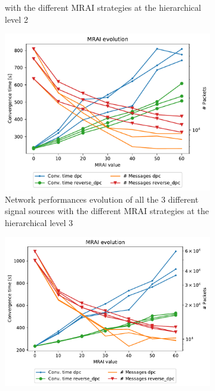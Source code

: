 \begin{figure}[h]
\begin{subfigure}[b]{0.45\textwidth}
{			with the different \ac{MRAI} strategies at the hierarchical level \num{2}}
         \label{fig:different_levels_2}
     \end{subfigure}
     \begin{subfigure}[b]{0.45\textwidth}
         \centering
         \includegraphics[width=\textwidth]{images/hierarchy/different_levels-1000_hier_3_all.pdf}
		 \caption{Network performances evolution of all the \num{3} different signal sources 
			with the different \ac{MRAI} strategies at the hierarchical level \num{3}}
         \label{fig:different_levels_3}
     \end{subfigure}
     \begin{subfigure}[b]{0.45\textwidth}
         \centering
         \includegraphics[width=\textwidth]{images/hierarchy/different_levels-1000_hier_4_all.pdf}

\end{subfigure}
\end{figure}
